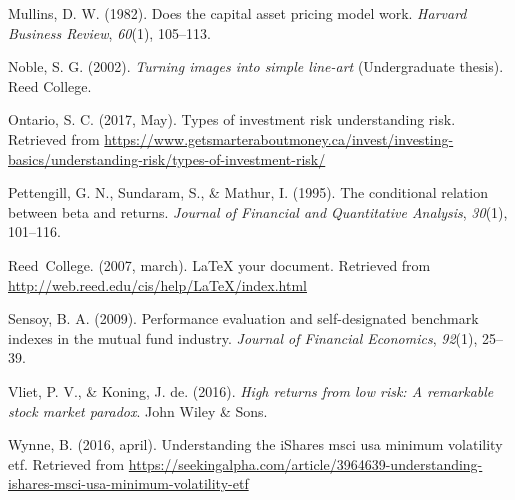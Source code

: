 \documentclass[12pt,twoside]{reedthesis}
\theoremstyle{definition}
\theoremstyle{definition}
\theoremstyle{definition}
\theoremstyle{remark}
\begin{document}
\hypertarget{ref-mullins1982}{}
Mullins, D. W. (1982). Does the capital asset pricing model work.
\emph{Harvard Business Review}, \emph{60}(1), 105--113.

\hypertarget{ref-noble2002}{}
Noble, S. G. (2002). \emph{Turning images into simple line-art}
(Undergraduate thesis). Reed College.

\hypertarget{ref-ontario2017}{}
Ontario, S. C. (2017, May). Types of investment risk \textbar{}
understanding risk. Retrieved from
\url{https://www.getsmarteraboutmoney.ca/invest/investing-basics/understanding-risk/types-of-investment-risk/}

\hypertarget{ref-pettengill1995}{}
Pettengill, G. N., Sundaram, S., \& Mathur, I. (1995). The conditional
relation between beta and returns. \emph{Journal of Financial and
Quantitative Analysis}, \emph{30}(1), 101--116.

\hypertarget{ref-reedweb2007}{}
Reed~College. (2007, march). LaTeX your document. Retrieved from
\url{http://web.reed.edu/cis/help/LaTeX/index.html}

\hypertarget{ref-sensoy2009}{}
Sensoy, B. A. (2009). Performance evaluation and self-designated
benchmark indexes in the mutual fund industry. \emph{Journal of
Financial Economics}, \emph{92}(1), 25--39.

\hypertarget{ref-van2016}{}
Vliet, P. V., \& Koning, J. de. (2016). \emph{High returns from low
risk: A remarkable stock market paradox}. John Wiley \& Sons.

\hypertarget{ref-wynne2016}{}
Wynne, B. (2016, april). Understanding the iShares msci usa minimum
volatility etf. Retrieved from
\url{https://seekingalpha.com/article/3964639-understanding-ishares-msci-usa-minimum-volatility-etf}


\end{document}
